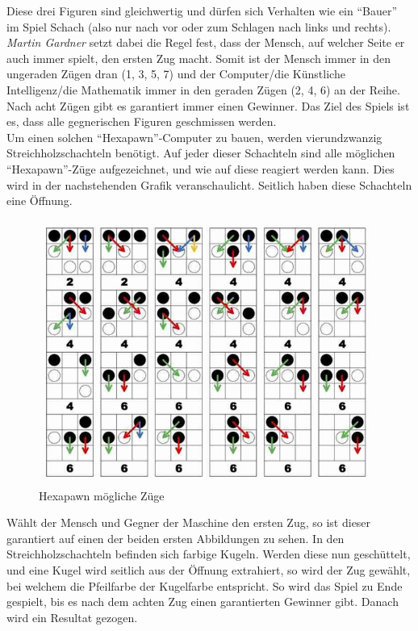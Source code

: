 Diese drei Figuren sind gleichwertig und dürfen sich Verhalten wie ein ``Bauer'' im Spiel Schach (also nur nach vor oder zum Schlagen nach links und rechts). \textit{Martin Gardner} setzt dabei die Regel fest, dass der Mensch, auf welcher Seite er auch immer spielt, den ersten Zug macht. Somit ist der Mensch immer in den ungeraden Zügen dran (1, 3, 5, 7) und der Computer/die Künstliche Intelligenz/die Mathematik immer in den geraden Zügen (2, 4, 6) an der Reihe. Nach acht Zügen gibt es garantiert immer einen Gewinner. Das Ziel des Spiels ist es, dass alle gegnerischen Figuren geschmissen werden.
\\
Um einen solchen ``Hexapawn''-Computer zu bauen, werden vierundzwanzig Streichholzschachteln benötigt. Auf jeder dieser Schachteln sind alle möglichen ``Hexapawn''-Züge aufgezeichnet, und wie auf diese reagiert werden kann. Dies wird in der nachstehenden Grafik veranschaulicht. Seitlich haben diese Schachteln eine Öffnung.


\begin{figure}[H]
    \centering
    \includegraphics[scale=0.7]{pics/hexapawn/hexapawn_zuege.jpg}
    \caption{Hexapawn mögliche Züge \cite{tech:hexapawn:cite}}
    \label{fig:tech:HexapawnZuege}
\end{figure}


Wählt der Mensch und Gegner der Maschine den ersten Zug, so ist dieser garantiert auf einen der beiden ersten Abbildungen zu sehen. In den Streichholzschachteln befinden sich farbige Kugeln. Werden diese nun geschüttelt, und eine Kugel wird seitlich aus der Öffnung extrahiert, so wird der Zug gewählt, bei welchem die Pfeilfarbe der Kugelfarbe entspricht. So wird das Spiel zu Ende gespielt, bis es nach dem achten Zug einen garantierten Gewinner gibt. Danach wird ein Resultat gezogen.

